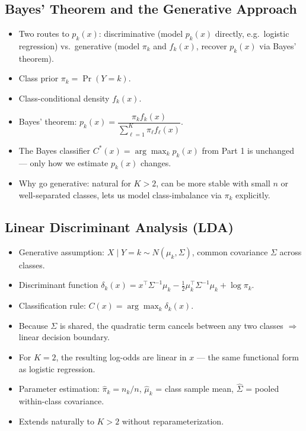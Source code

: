 \documentclass[11pt]{article}
\begin{document}
\subsection{Bayes' Theorem and the Generative Approach}
\begin{itemize}
\item Two routes to $p_k(x)$: discriminative (model $p_k(x)$ directly, e.g.\ logistic regression) vs.\ generative (model $\pi_k$ and $f_k(x)$, recover $p_k(x)$ via Bayes' theorem).
\item Class prior $\pi_k = \Pr(Y=k)$.
\item Class-conditional density $f_k(x)$.
\item Bayes' theorem: $p_k(x) = \dfrac{\pi_k f_k(x)}{\sum_{\ell=1}^K \pi_\ell f_\ell(x)}$.
\item The Bayes classifier $C^*(x)=\arg\max_k p_k(x)$ from Part 1 is unchanged --- only how we estimate $p_k(x)$ changes.
\item Why go generative: natural for $K>2$, can be more stable with small $n$ or well-separated classes, lets us model class-imbalance via $\pi_k$ explicitly.
\end{itemize}

\subsection{Linear Discriminant Analysis (LDA)}
\begin{itemize}
\item Generative assumption: $X\mid Y=k \sim N(\mu_k,\Sigma)$, common covariance $\Sigma$ across classes.
\item Discriminant function $\delta_k(x) = x^\top\Sigma^{-1}\mu_k - \tfrac12\mu_k^\top\Sigma^{-1}\mu_k+\log\pi_k$.
\item Classification rule: $C(x)=\arg\max_k \delta_k(x)$.
\item Because $\Sigma$ is shared, the quadratic term cancels between any two classes $\Rightarrow$ linear decision boundary.
\item For $K=2$, the resulting log-odds are linear in $x$ --- the same functional form as logistic regression.
\item Parameter estimation: $\hat\pi_k = n_k/n$, $\hat\mu_k$ = class sample mean, $\hat\Sigma$ = pooled within-class covariance.
\item Extends naturally to $K>2$ without reparameterization.
\end{itemize}
\end{document}
